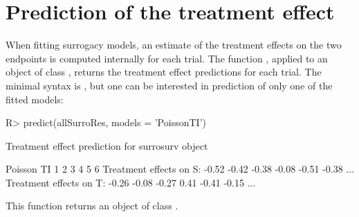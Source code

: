 \documentclass[article,shortnames, nojss]{jss}\usepackage[]{graphicx}\usepackage[]{color}
\begin{document}
\section{Prediction of the treatment effect}
When fitting surrogacy models,
an estimate of the treatment effects on the two endpoints
is computed internally for each trial.
The function , applied to an object of class ,
returns the treatment effect predictions
for each trial.
The minimal syntax is ,
but one can be interested in prediction of only one of the fitted models:
\begin{Schunk}
\begin{Sinput}
R> predict(allSurroRes, models = 'PoissonTI')
\end{Sinput}
\begin{Soutput}
Treatment effect prediction for surrosurv object

   Poisson TI 
                            1     2     3     4     5     6        
    Treatment effects on S: -0.52 -0.42 -0.38 -0.08 -0.51 -0.38 ...
    Treatment effects on T: -0.26 -0.08 -0.27  0.41 -0.41 -0.15 ...
\end{Soutput}
\end{Schunk}
This function returns an object of class .
\end{document}
